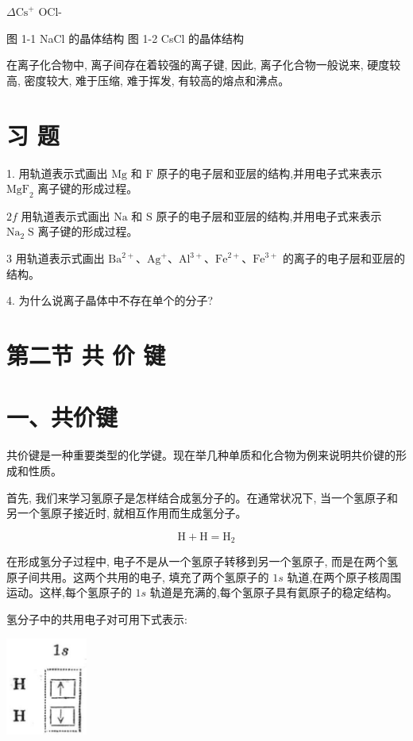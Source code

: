 \documentclass[10pt]{article}
\begin{document}
\(\Delta {\mathrm{{Cs}}}^{ + }\) OCl-

图 1-1 NaCl 的晶体结构 图 1-2 CsCl 的晶体结构

在离子化合物中, 离子间存在着较强的离子键, 因此, 离子化合物一般说来, 硬度较高, 密度较大, 难于压缩, 难于挥发, 有较高的熔点和沸点。

\section*{习 题}

1. 用轨道表示式画出 \(\mathrm{{Mg}}\) 和 \(\mathrm{F}\) 原子的电子层和亚层的结构,并用电子式来表示 \({\mathrm{{MgF}}}_{2}\) 离子键的形成过程。

\({2f}\) 用轨道表示式画出 \(\mathrm{{Na}}\) 和 \(\mathrm{S}\) 原子的电子层和亚层的结构,并用电子式来表示 \({\mathrm{{Na}}}_{2}\mathrm{\;S}\) 离子键的形成过程。

3 用轨道表示式画出 \({\mathrm{{Ba}}}^{2 + }\text{、}{\mathrm{{Ag}}}^{ + }\text{、}{\mathrm{{Al}}}^{3 + }\text{、}{\mathrm{{Fe}}}^{2 + }\text{、}{\mathrm{{Fe}}}^{3 + }\) 的离子的电子层和亚层的结构。

4. 为什么说离子晶体中不存在单个的分子?

\section*{第二节 共 价 键}

\section*{一、共价键}

共价键是一种重要类型的化学键。现在举几种单质和化合物为例来说明共价键的形成和性质。

首先, 我们来学习氢原子是怎样结合成氢分子的。在通常状况下, 当一个氢原子和另一个氢原子接近时, 就相互作用而生成氢分子。

\[
\mathrm{H} + \mathrm{H} = {\mathrm{H}}_{2}
\]

在形成氢分子过程中, 电子不是从一个氢原子转移到另一个氢原子, 而是在两个氢原子间共用。这两个共用的电子, 填充了两个氢原子的 \({1s}\) 轨道,在两个原子核周围运动。这样,每个氢原子的 \({1s}\) 轨道是充满的,每个氢原子具有氦原子的稳定结构。

氢分子中的共用电子对可用下式表示:

\begin{center}
\includegraphics[max width=0.2\textwidth]{images/01912d13-9986-7822-a012-3f3f7be99dcb_11_655797.jpg}
\end{center}
\end{document}
